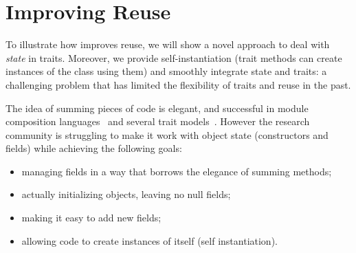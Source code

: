 \saveSpace\saveSpace\section{Improving Reuse}\saveSpace




To illustrate how \name improves reuse,
we will show a novel approach
to deal with \emph{state} in traits.
Moreover, we provide self-instantiation (trait methods can create instances of the class using them)
 and smoothly integrate state and traits: a challenging problem that has limited the flexibility of traits and
reuse in the past.

The idea of summing pieces of
code is elegant, and successful in module
composition languages~\cite{ancona2002calculus} and several trait
models~\cite{ducasse2006traits,Bergel2007,BETTINI2013521,fjig}.  However the research
community is struggling to make it work with object state (constructors
and fields) while achieving the following goals:

\begin{itemize}
\item managing fields in a way that borrows the elegance of summing methods;
\item actually initializing objects, leaving no null fields;
\item making it easy to add new fields;
\item allowing code to create instances of itself (self instantiation).
\end{itemize}

